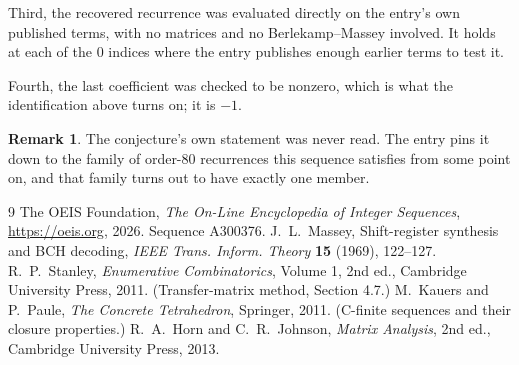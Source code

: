 \documentclass[11pt,a4paper]{article}
\theoremstyle{plain}
\theoremstyle{definition}
\newtheorem{remark}[theorem]{Remark}
\begin{document}
Third, the recovered recurrence was evaluated directly on the entry's own published terms, with
no matrices and no Berlekamp--Massey involved. It holds at each of the $0$ indices where
the entry publishes enough earlier terms to test it.

Fourth, the last coefficient was checked to be nonzero, which is what the identification above
turns on; it is $-1$.

\begin{remark}
The conjecture's own statement was never read. The entry pins it down to the family of
order-$80$ recurrences this sequence satisfies from some point on, and that family turns
out to have exactly one member.
\end{remark}

\begin{thebibliography}{9}
 The OEIS Foundation, \emph{The On-Line Encyclopedia of Integer
Sequences}, \url{https://oeis.org}, 2026. Sequence A300376.
 J.~L.~Massey, Shift-register synthesis and BCH decoding, \emph{IEEE
Trans. Inform. Theory} \textbf{15} (1969), 122--127.
 R.~P.~Stanley, \emph{Enumerative Combinatorics}, Volume 1, 2nd ed.,
Cambridge University Press, 2011. (Transfer-matrix method, Section 4.7.)
 M.~Kauers and P.~Paule, \emph{The Concrete Tetrahedron}, Springer, 2011.
(C-finite sequences and their closure properties.)
 R.~A.~Horn and C.~R.~Johnson, \emph{Matrix Analysis}, 2nd ed., Cambridge
University Press, 2013.
\end{thebibliography}
\end{document}
